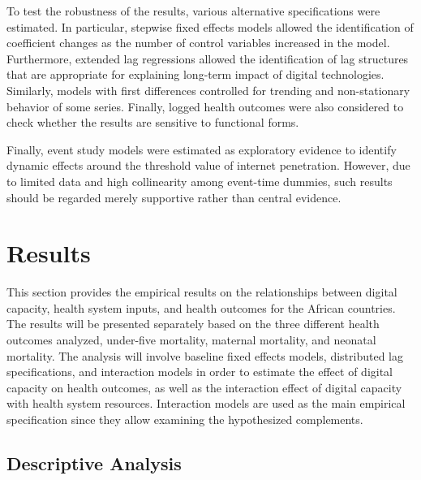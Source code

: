 \documentclass[12pt]{article}
\begin{document}
To test the robustness of the results, various alternative specifications were estimated. In particular, stepwise fixed effects models allowed the identification of coefficient changes as the number of control variables increased in the model. Furthermore, extended lag regressions allowed the identification of lag structures that are appropriate for explaining long-term impact of digital technologies. Similarly, models with first differences controlled for trending and non-stationary behavior of some series. Finally, logged health outcomes were also considered to check whether the results are sensitive to functional forms.

Finally, event study models were estimated as exploratory evidence to identify dynamic effects around the threshold value of internet penetration. However, due to limited data and high collinearity among event-time dummies, such results should be regarded merely supportive rather than central evidence.


\section{Results}

This section provides the empirical results on the relationships between digital capacity, health system inputs, and health outcomes for the African countries. The results will be presented separately based on the three different health outcomes analyzed, under-five mortality, maternal mortality, and neonatal mortality. The analysis will involve baseline fixed effects models, distributed lag specifications, and interaction models in order to estimate the effect of digital capacity on health outcomes, as well as the interaction effect of digital capacity with health system resources. Interaction models are used as the main empirical specification since they allow examining the hypothesized complements.

\subsection{Descriptive Analysis}
\end{document}

